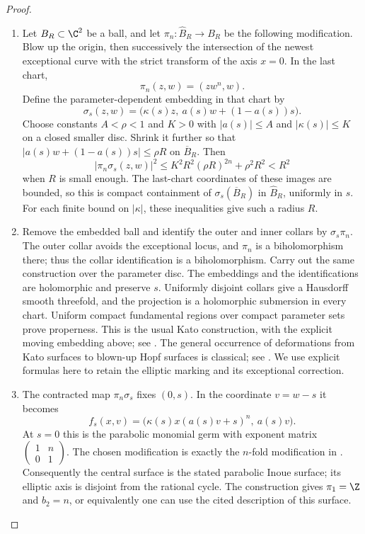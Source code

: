 \begin{proof}
\begin{enumerate}[label=\arabic*.,leftmargin=*]
\item Let
$B_R\subset\C^2$ be a ball, and let
$\pi_n:\widehat B_R\to B_R$ be the following modification.
Blow up the origin, then successively the intersection of the newest
exceptional curve with the strict transform of the axis $x=0$.
In the last chart,
\[
 \pi_n(z,w)=(zw^n,w).
\]
Define the parameter-dependent embedding in that chart by
\[
 \sigma_s(z,w)=
       \bigl(\kappa(s)z,\ a(s)w+(1-a(s))s\bigr).
\]
Choose constants $A<\rho<1$ and $K>0$ with
$|a(s)|\le A$ and $|\kappa(s)|\le K$ on a closed smaller disc.
Shrink it further so that
$|a(s)w+(1-a(s))s|\le\rho R$ on $\overline B_R$.
Then
\[
 |\pi_n\sigma_s(z,w)|^2
 \le K^2R^2(\rho R)^{2n}+\rho^2R^2<R^2
\]
when $R$ is small enough. The last-chart coordinates of these images
are bounded, so this is compact containment of
$\sigma_s(\overline B_R)$ in $\widehat B_R$, uniformly in $s$.
For each finite bound on $|\kappa|$, these inequalities give such a radius $R$.

\item Remove the embedded ball and identify the outer and inner collars by
$\sigma_s\pi_n$. The outer collar avoids the exceptional locus, and
$\pi_n$ is a biholomorphism there; thus the collar identification is
a biholomorphism. Carry out the same construction over the parameter
disc. The embeddings and the identifications are holomorphic and
preserve $s$. Uniformly disjoint collars give a Hausdorff smooth
threefold, and the projection is a holomorphic submersion in every
chart. Uniform compact fundamental regions over compact parameter
sets prove properness. This is the usual Kato construction, with
the explicit moving embedding above; see
\citet[Section 2, pp.1351--1353]{IstratiEtAl2022Root}.
The general occurrence of deformations from Kato surfaces to
blown-up Hopf surfaces is classical; see
\citet[Introduction, pp.1750--1751]{Teleman2010AB}.
We use explicit formulas here to retain the elliptic marking and
its exceptional correction.

\item The contracted map $\pi_n\sigma_s$ fixes $(0,s)$.
In the coordinate $v=w-s$ it becomes
\[
 f_s(x,v)=
    \bigl(\kappa(s)x(a(s)v+s)^n,\ a(s)v\bigr).
\]
At $s=0$ this is the parabolic monomial germ with exponent matrix
$\left(\begin{smallmatrix}1&n\\0&1\end{smallmatrix}\right)$.
The chosen modification is exactly the $n$-fold modification in
\citet[Example 9.10, p.1386]{IstratiEtAl2022Root}.
Consequently the central surface is the stated parabolic Inoue
surface; its elliptic axis is disjoint from the rational cycle.
The construction gives $\pi_1=\Z$ and $b_2=n$, or equivalently one
can use the cited description of this surface.


\end{enumerate}
\end{proof}
